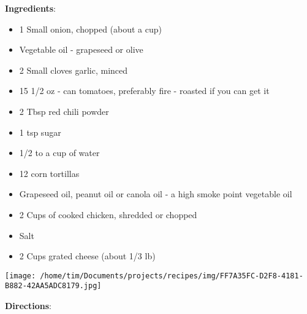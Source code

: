 \documentclass[11pt, twoside, openany]{book}
\begin{document}
\begin{minipage}[t]{0.8\linewidth}
\textbf{Ingredients}:\vspace{-3mm}
\begin{multicols}{2}
\begin{itemize}\setlength\itemsep{-1mm}
\item 1 Small onion, chopped (about a cup)
\item Vegetable oil - grapeseed or olive
\item 2 Small cloves garlic, minced
\item 15 1/2 oz - can tomatoes, preferably fire - roasted if you can get it
\item 2 Tbsp red chili powder
\item 1 tsp sugar
\item 1/2 to a cup of water
\item 12 corn tortillas
\item Grapeseed oil, peanut oil or canola oil - a high smoke point vegetable oil
\item 2 Cups of cooked chicken, shredded or chopped
\item Salt
\item 2 Cups grated cheese (about 1/3 lb)
\end{itemize}
\end{multicols}
\end{minipage}
\begin{minipage}[t]{0.2\linewidth}
\centering \strut\vspace*{-\baselineskip}\newline
\texttt{[image: /home/tim/Documents/projects/recipes/img/FF7A35FC-D2F8-4181-B882-42AA5ADC8179.jpg]}\\
\end{minipage}\vspace{3mm}
\textbf{Directions}:
\end{document}
